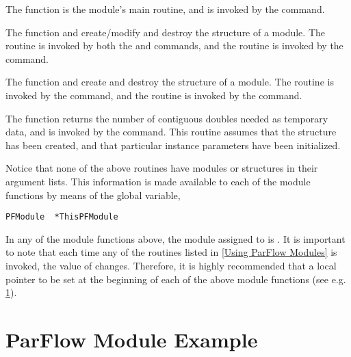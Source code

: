 The function  is the module's main routine, and is
invoked by the  command.

The function  and 
create/modify and destroy the  structure of a module.
The  routine is invoked by both the
 and  commands,
and the  routine is invoked by the
 command.

The function  and 
create and destroy the  structure of a module.
The  routine is invoked by the
 command, and the 
routine is invoked by the  command.

The function  returns the number of
contiguous doubles needed as temporary data, and is invoked by
the  command.
This routine assumes that the  structure has been
created, and that particular instance parameters have been initialized.

Notice that none of the above routines have modules or 
structures in their argument lists.
This information is made available to each of the module functions
by means of the global variable,

\begin{display}\begin{verbatim}
PFModule  *ThisPFModule
\end{verbatim}\end{display}

In any of the module functions above, the module assigned to
 is .
It is important to note that each time any of the routines listed in
\ref{Using ParFlow Modules} is invoked, the value of 
changes.
Therefore, it is highly recommended that a local pointer to
 be set at the beginning of each of the above
module functions (see e.g. \ref{ParFlow Module Example}).


\section{ParFlow Module Example}
\label{ParFlow Module Example}

